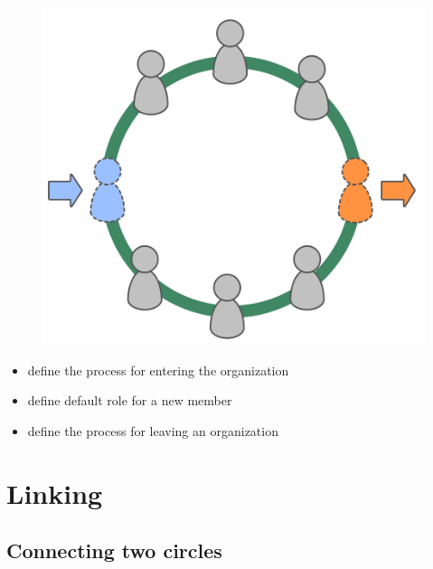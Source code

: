 \begin{figure}[htbp]
\centering
\includegraphics[keepaspectratio,width=\textwidth,height=0.75\textheight]{img/circle/enter-leave-circle.png}
\end{figure}

\begin{itemize}
\item define the process for entering the organization

\item define default role for a new member

\item define the process for leaving an organization

\end{itemize}

\section{Linking}
\label{linking}

\subsection{Connecting two circles}
\label{connectingtwocircles}

